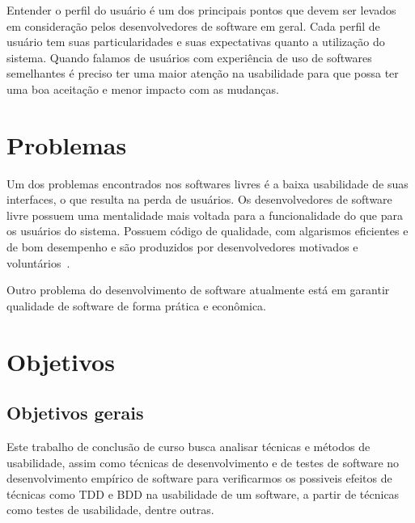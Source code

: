 Entender o perfil do usuário é um dos principais pontos que devem ser levados em consideração pelos desenvolvedores de software em geral. Cada perfil de usuário tem suas particularidades e suas expectativas quanto a utilização do sistema. Quando falamos de usuários com experiência de uso de softwares semelhantes é preciso ter uma maior atenção na usabilidade para que possa ter uma boa aceitação e menor impacto com as mudanças.

\section{Problemas}

Um dos problemas encontrados nos softwares livres é a baixa usabilidade de suas interfaces, o que resulta na perda de usuários. 
%
Os desenvolvedores de software livre possuem uma mentalidade mais voltada para a funcionalidade do que para os usuários do sistema. Possuem código de qualidade, com algarismos eficientes e de bom desempenho e são produzidos por desenvolvedores motivados e voluntários~\cite{santos2012}. 

Outro problema do desenvolvimento de software atualmente está em garantir qualidade de software de forma prática e econômica.


\section{Objetivos}

\subsection{Objetivos gerais}
	 
Este trabalho de conclusão de curso busca analisar técnicas e métodos de usabilidade, assim como técnicas de desenvolvimento e de testes de software no desenvolvimento empírico de software para verificarmos os possiveis efeitos de técnicas como TDD e BDD na usabilidade de um software, a partir de técnicas como testes de usabilidade, dentre outras.
	 
